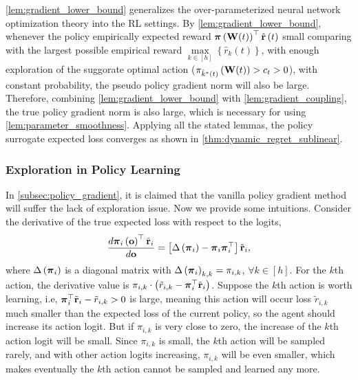 \cref{lem:gradient_lower_bound} generalizes the over-parameterized neural network optimization theory into the RL settings. By \cref{lem:gradient_lower_bound}, whenever the policy empirically expected reward ${\boldsymbol{\pi}}\left( {\mathbf{W}}(t) \right)^\top \hat{{\mathbf{r}}}\left(t\right)$ small comparing with the largest possible empirical reward $\max\limits_{k \in \left[h\right]}\left\{ \hat{r}_k\left(t\right) \right\}$, with enough exploration of the suggorate optimal action ($\pi_{\hat{k}^*(t)}\left({\mathbf{W}}(t)\right) > c_t > 0$), with constant probability, the pseudo policy gradient norm will also be large. Therefore, combining \cref{lem:gradient_lower_bound} with \cref{lem:gradient_coupling}, the true policy gradient norm is also large, which is necessary for using \cref{lem:parameter_smoothness}. Applying all the stated lemmas, the policy surrogate expected loss converges as shown in \cref{thm:dynamic_regret_sublinear}.

\subsubsection{Exploration in Policy Learning}
\label{subsubsec:exploration_in_policy_learning}

In \cref{subsec:policy_gradient}, it is claimed that the vanilla policy gradient method will suffer the lack of exploration issue. Now we provide some intuitions. Consider the derivative of the true expected loss with respect to the logits,
\begin{equation}
\label{eq:logit_derivative}
\begin{split}
    \frac{d {\boldsymbol{\pi}}_i\left( {\mathbf{o}} \right)^\top {\tilde{\mathbf{r}}}_i}{d {\mathbf{o}}} = \left[ \Delta\left( {\boldsymbol{\pi}}_i \right) - {\boldsymbol{\pi}}_i {\boldsymbol{\pi}}_i^\top \right] {\tilde{\mathbf{r}}}_i,
\end{split}
\end{equation}
where $\Delta\left( {\boldsymbol{\pi}}_i \right)$ is a diagonal matrix with $\Delta\left( {\boldsymbol{\pi}}_i \right)_{k,k} = \pi_{i,k}$, $\forall k \in [h]$. For the $k$th action, the derivative value is $\pi_{i,k} \cdot \left( \tilde{r}_{i,k} - {\boldsymbol{\pi}}_i^\top {\tilde{\mathbf{r}}}_i \right)$. Suppose the $k$th action is worth learning, i.e, ${\boldsymbol{\pi}}_i^\top {\tilde{\mathbf{r}}}_i - \tilde{r}_{i,k} > 0$ is large, meaning this action will occur loss $\tilde{r}_{i,k}$ much smaller than the expected loss of the current policy, so the agent should increase its action logit. But if $\pi_{i,k}$ is very close to zero, the increase of the $k$th action logit will be small. Since $\pi_{i,k}$ is small, the $k$th action will be sampled rarely, and with other action logits increasing, $\pi_{i,k}$ will be even smaller, which makes eventually the $k$th action cannot be sampled and learned any more.

